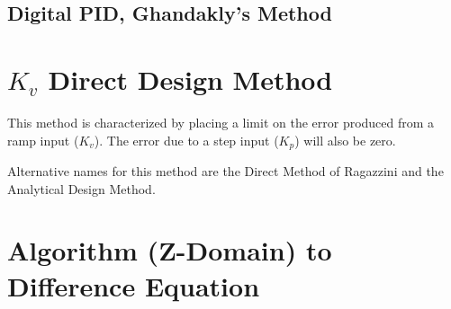 \documentclass{article}
\newcommand{\sincludepdf}[2][]{
	
}
\begin{document}
\sincludepdf[pages={9},
			pagecommand=\subsubsection*{Example 4}
		]{scan/11221301.pdf}

\subsection{Digital PID, Ghandakly's Method}


\sincludepdf[pages={3},
		pagecommand=\section{Final Value Theorem}
		]{scan/11241301.pdf}

\section{$K_v$ Direct Design Method}

This method is characterized by placing a limit on the error
produced from a ramp input ($K_v$).
The error due to a step input ($K_p$) will also be zero.

Alternative names for this method are the Direct Method
of Ragazzini\autocite[Pg. 264]{franklin1998digital} and
the Analytical Design Method\autocite[Pg. 242]{ogata1995discrete}.

\section{Algorithm (Z-Domain) to Difference Equation}

\sincludepdf[pages={11},
			pagecommand=\subsection*{Example 1}
		]{scan/11211301.pdf}

\sincludepdf[pages={12},
			pagecommand=\subsection*{Example 2}
		]{scan/11211301.pdf}

\sincludepdf[pages={13},
			pagecommand=\subsection*{Example 3}
		]{scan/11211301.pdf}
\end{document}
